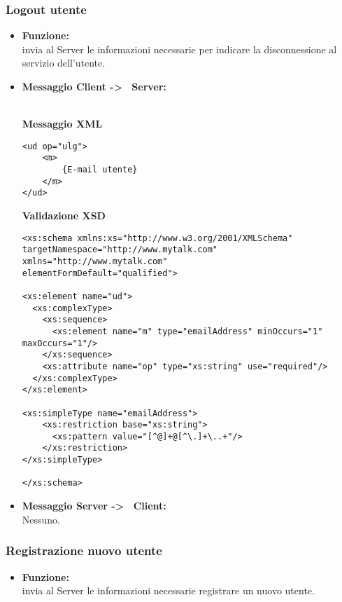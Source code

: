 {		\subsubsection{Logout utente}{
	\label{opUlg}
		\begin{itemize}
			\item[] \textbf{Funzione:}{\\
				invia al Server le informazioni necessarie per indicare la disconnessione al servizio dell'utente.
				}
			
			\item[] \textbf{Messaggio Client -\textgreater~ Server:}{\\
				\textbf{Messaggio XML}\\
				\begin{lstlisting}
<ud op="ulg">
	<m>
		{E-mail utente}
	</m>
</ud>
				\end{lstlisting}
				\textbf{Validazione XSD}\\
				\begin{lstlisting}
<xs:schema xmlns:xs="http://www.w3.org/2001/XMLSchema"
targetNamespace="http://www.mytalk.com"
xmlns="http://www.mytalk.com"
elementFormDefault="qualified">

<xs:element name="ud">
  <xs:complexType>
    <xs:sequence>
      <xs:element name="m" type="emailAddress" minOccurs="1" maxOccurs="1"/>
    </xs:sequence>
    <xs:attribute name="op" type="xs:string" use="required"/>
  </xs:complexType>
</xs:element>

<xs:simpleType name="emailAddress"> 
    <xs:restriction base="xs:string"> 
      <xs:pattern value="[^@]+@[^\.]+\..+"/> 
    </xs:restriction> 
</xs:simpleType> 

</xs:schema>
				\end{lstlisting}
			}
				\item[] \textbf{Messaggio Server -\textgreater~ Client:}{\\
				Nessuno.
				}
		\end{itemize}
	}%
	
		\subsubsection{Registrazione nuovo utente}{
	\label{opUReg}
		\begin{itemize}
			\item[] \textbf{Funzione:}{\\
				invia al Server le informazioni necessarie registrare un nuovo utente.
				}
			

\end{itemize}}}
